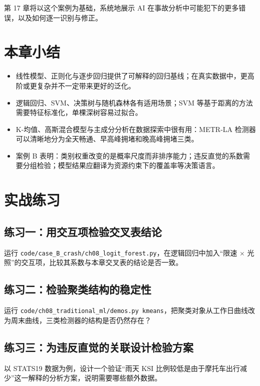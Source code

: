 第 17 章将以这个案例为基础，系统地展示 AI 在事故分析中可能犯下的更多错误，以及如何逐一识别与修正。

\section{本章小结}

\begin{itemize}
  \item 线性模型、正则化与逐步回归提供了可解释的回归基线；在真实数据中，更高阶或更复杂并不一定带来更好的泛化。
  \item 逻辑回归、SVM、决策树与随机森林各有适用场景；SVM 等基于距离的方法需要特征标准化，单棵深树容易过拟合。
  \item K-均值、高斯混合模型与主成分分析在数据探索中很有用：METR-LA 检测器可以清晰地分为全天畅通、早高峰拥堵和晚高峰拥堵三类。
  \item 案例 B 表明：类别权重改变的是概率尺度而非排序能力；违反直觉的系数需要分组检验；模型结果应翻译为资源约束下的覆盖率等决策语言。
\end{itemize}

\section{实战练习}

\subsection*{练习一：用交互项检验交叉表结论}

运行 \texttt{code/case\_B\_crash/ch08\_logit\_forest.py}，在逻辑回归中加入“限速 $\times$ 光照”的交互项，比较其系数与本章交叉表的结论是否一致。

\subsection*{练习二：检验聚类结构的稳定性}

运行 \texttt{code/ch08\_traditional\_ml/demos.py kmeans}，把聚类对象从工作日曲线改为周末曲线，三类检测器的结构是否仍然存在？

\subsection*{练习三：为违反直觉的关联设计检验方案}

以 STATS19 数据为例，设计一个验证“雨天 KSI 比例较低是由于摩托车出行减少”这一解释的分析方案，说明需要哪些额外数据。

